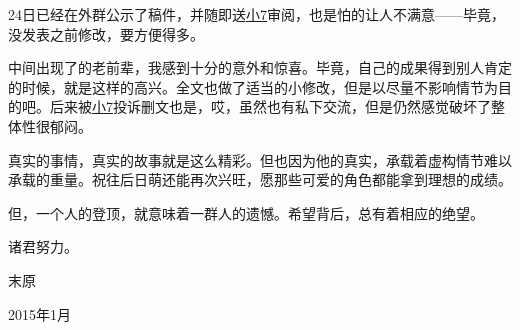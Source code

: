 24日已经在外群公示了稿件，并随即送\uline{小7}审阅，也是怕的让人不满意——毕竟，没发表之前修改，要方便得多。

中间出现了的老前辈，我感到十分的意外和惊喜。毕竟，自己的成果得到别人肯定的时候，就是这样的高兴。全文也做了适当的小修改，但是以尽量不影响情节为目的吧。后来被\uline{小7}投诉删文也是，哎，虽然也有私下交流，但是仍然感觉破坏了整体性很郁闷。

真实的事情，真实的故事就是这么精彩。但也因为他的真实，承载着虚构情节难以承载的重量。祝往后日萌还能再次兴旺，愿那些可爱的角色都能拿到理想的成绩。

但，一个人的登顶，就意味着一群人的遗憾。希望背后，总有着相应的绝望。

诸君努力。

\begin{flushright}
  \rm\kai 末原

  2015年1月
\end{flushright}
